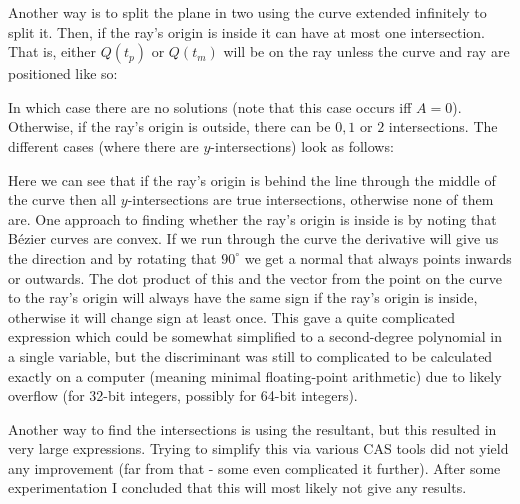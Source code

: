 \documentclass[11pt, a4paper]{article}
\begin{document}
Another way is to split the plane in two using the curve extended infinitely to split it. Then, if the ray's origin is inside it can have at most one intersection. That is, either $Q(t_p)$ or $Q(t_m)$ will be on the ray unless the curve and ray are positioned like so:
\begin{figure}[H]
\centering
{}
\end{figure}
In which case there are no solutions (note that this case occurs iff $A=0$).
Otherwise, if the ray's origin is outside, there can be $0, 1$ or $2$ intersections. The different cases (where there are $y$-intersections) look as follows:
\begin{figure}[H]
\centering
{}
\end{figure}
Here we can see that if the ray's origin is behind the line through the middle of the curve then all $y$-intersections are true intersections, otherwise none of them are.
One approach to finding whether the ray's origin is inside is by noting that Bézier curves are convex. If we run through the curve the derivative will give us the direction and by rotating that $90^\circ$ we get a normal that always points inwards or outwards. The dot product of this and the vector from the point on the curve to the ray's origin will always have the same sign if the ray's origin is inside, otherwise it will change sign at least once.
This gave a quite complicated expression which could be somewhat simplified to a second-degree polynomial in a single variable, but the discriminant was still to complicated to be calculated exactly on a computer (meaning minimal floating-point arithmetic) due to likely overflow (for 32-bit integers, possibly for 64-bit integers).

Another way to find the intersections is using the resultant, but this resulted in very large expressions. Trying to simplify this via various CAS tools did not yield any improvement (far from that - some even complicated it further). After some experimentation I concluded that this will most likely not give any results.
\end{document}
